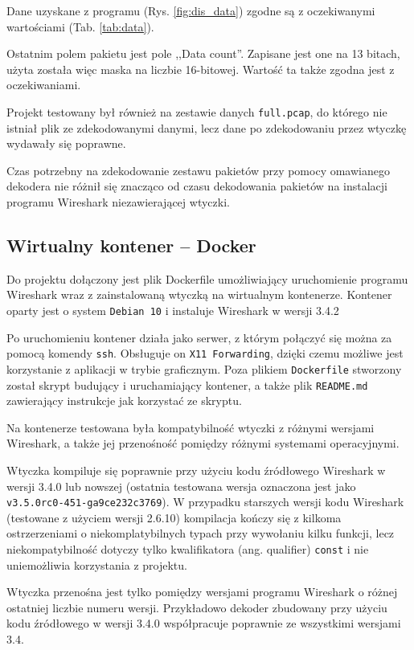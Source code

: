 \documentclass[a4paper, 12pt, twoside, openright]{article}
\begin{document}
	Dane uzyskane z programu (Rys. \ref{fig:dis_data}) zgodne są z oczekiwanymi wartościami (Tab. \ref{tab:data}).

	Ostatnim polem pakietu jest pole ,,Data count''. Zapisane jest one na 13 bitach, użyta została więc maska na liczbie 16-bitowej.
	Wartość ta także zgodna jest z oczekiwaniami.

	Projekt testowany był również na zestawie danych \texttt{full.pcap}, do którego nie istniał plik ze zdekodowanymi danymi,
	lecz dane po zdekodowaniu przez wtyczkę wydawały się poprawne.

	Czas potrzebny na zdekodowanie zestawu pakietów przy pomocy omawianego dekodera nie różnił się znacząco od czasu dekodowania pakietów
	na instalacji programu Wireshark niezawierającej wtyczki.

	\subsection{Wirtualny kontener -- Docker}

	Do projektu dołączony jest plik Dockerfile umożliwiający uruchomienie programu Wireshark wraz z zainstalowaną wtyczką
	na wirtualnym kontenerze. Kontener oparty jest o system \texttt{Debian 10} i instaluje Wireshark w wersji 3.4.2

	Po uruchomieniu kontener działa jako serwer, z którym połączyć się można za pomocą komendy \texttt{ssh}.
	Obsługuje on \texttt{X11 Forwarding}, dzięki czemu możliwe jest korzystanie z aplikacji w trybie graficznym.
	Poza plikiem \texttt{Dockerfile} stworzony został skrypt budujący i uruchamiający kontener, a także plik
	\texttt{README.md} zawierający instrukcje jak korzystać ze skryptu.

	Na kontenerze testowana była kompatybilność wtyczki z różnymi wersjami Wireshark, a także jej przenośność pomiędzy
	różnymi systemami operacyjnymi.

	Wtyczka kompiluje się poprawnie przy użyciu kodu źródłowego Wireshark w wersji 3.4.0 lub nowszej (ostatnia testowana
	wersja oznaczona jest jako \texttt{v3.5.0rc0-451-ga9ce232c3769}). W przypadku starszych wersji kodu Wireshark
	(testowane z użyciem wersji 2.6.10) kompilacja kończy się z kilkoma ostrzerzeniami o niekomplatybilnych typach przy
	wywołaniu kilku funkcji, lecz niekompatybilność dotyczy tylko kwalifikatora (ang. qualifier) \texttt{const}
	i nie uniemożliwia korzystania z projektu.

	Wtyczka przenośna jest tylko pomiędzy wersjami programu Wireshark o różnej ostatniej liczbie numeru wersji.
	Przykładowo dekoder zbudowany przy użyciu kodu źródłowego w wersji 3.4.0 współpracuje poprawnie ze wszystkimi wersjami
	3.4.
\end{document}
